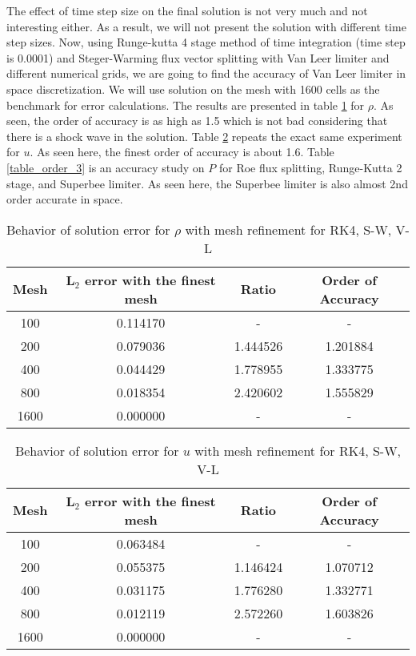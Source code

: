 \documentclass{article}
\begin{document}
The effect of time step size on the final solution is not very much and not interesting either. As a result, we will not present the solution with different time step sizes. Now, using Runge-kutta 4 stage method of time integration (time step is 0.0001) and Steger-Warming flux vector splitting with Van Leer limiter and different numerical grids, we are going to find the accuracy of Van Leer limiter in space discretization. We will use solution on the mesh with 1600 cells as the benchmark for error calculations. The results are presented in table \ref{table_order_1} for $\rho$. As seen, the order of accuracy is as high as 1.5 which is not bad considering that there is a shock wave in the solution. Table \ref{table_order_2} repeats the exact same experiment for $u$. As seen here, the finest order of accuracy is about 1.6. Table \ref{table_order_3} is an accuracy study on $P$ for Roe flux splitting, Runge-Kutta 2 stage, and Superbee limiter. As seen here, the Superbee limiter is also almost 2nd order accurate in space.
\begin{table}[H]
\centering
\caption{Behavior of solution error for $\rho$ with mesh refinement for RK4, S-W, V-L}
\label{table_order_1}
\begin{tabular}{cccc}
\hline
Mesh & L$_2$ error with the finest mesh & Ratio & Order of Accuracy\\
\hline\hline
100&  0.114170 & - & - \\
200&  0.079036 & 1.444526 & 1.201884\\
400&  0.044429 & 1.778955 & 1.333775\\
800&  0.018354 & 2.420602 & 1.555829\\
1600& 0.000000 & - & -\\
\hline
\end{tabular}
\end{table}
\begin{table}[H]
\centering
\caption{Behavior of solution error for $u$ with mesh refinement for RK4, S-W, V-L}
\label{table_order_2}
\begin{tabular}{cccc}
\hline
Mesh & L$_2$ error with the finest mesh & Ratio & Order of Accuracy\\
\hline\hline
100&  0.063484 & - & - \\
200&  0.055375 & 1.146424 & 1.070712 \\
400&  0.031175 & 1.776280 & 1.332771 \\
800&  0.012119 & 2.572260 & 1.603826 \\
1600& 0.000000 & - & -\\
\hline
\end{tabular}
\end{table}
\end{document}
